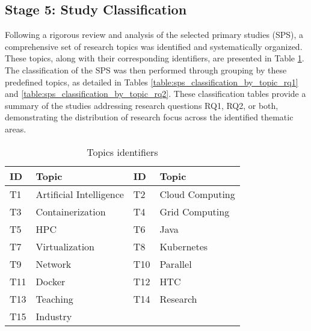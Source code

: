 \subsection{Stage 5: Study Classification}\label{subsec:clasificacion-de-estudios}
Following a rigorous review and analysis of the selected primary studies (SPS), a comprehensive set of research topics was identified and systematically organized. These topics, along with their corresponding identifiers, are presented in Table \ref{table:topics}. The classification of the SPS was then performed through grouping by these predefined topics, as detailed in Tables \ref{table:sps_classification_by_topic_rq1} and \ref{table:sps_classification_by_topic_rq2}. These classification tables provide a summary of the studies addressing research questions RQ1, RQ2, or both, demonstrating the distribution of research focus across the identified thematic areas.

\begin{table}[ht]
    \renewcommand{\arraystretch}{1.3}
    \centering
    \caption{Topics identifiers}
    \begin{tabular}{p{0.5cm}>{\raggedright\arraybackslash}p{2.5cm}p{0.5cm}>{\raggedright\arraybackslash}p{2.5cm}}
        \hline
        \textbf{ID} & \textbf{Topic} & \textbf{ID} & \textbf{Topic} \\
        \hline
        T1 & Artificial Intelligence & T2 & Cloud Computing \\
        T3 & Containerization & T4 & Grid Computing \\
        T5 & HPC & T6 & Java \\
        T7 & Virtualization & T8 & Kubernetes \\
        T9 & Network & T10 & Parallel \\
        T11 & Docker & T12 & HTC \\
        T13 & Teaching & T14 & Research \\
        T15 & Industry & \\
        \hline
    \end{tabular}
    \label{table:topics}
\end{table}

